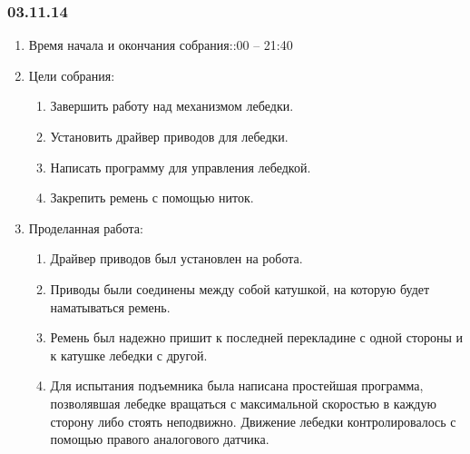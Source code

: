 	
\subsubsection{03.11.14}

\begin{enumerate}
	\item Время начала и окончания собрания::00 – 21:40
	\item Цели собрания:\newline
	\begin{enumerate}
	  \item	Завершить работу над механизмом лебедки.\newline
	  
	  \item	Установить драйвер приводов для лебедки.\newline
	  
	  \item	Написать программу для управления лебедкой.\newline
	  
	  \item	Закрепить ремень с помощью ниток.\newline
	  
    \end{enumerate}
    
	\item Проделанная работа:\newline
	\begin{enumerate}
	  \item	Драйвер приводов был установлен на робота.\newline
      
      \item	Приводы были соединены между собой катушкой, на которую будет наматываться ремень.\newline
      
      \item	Ремень был надежно пришит к последней перекладине с одной стороны и к катушке лебедки с другой.\newline
      
      \item	Для испытания подъемника была написана простейшая программа, позволявшая лебедке вращаться с максимальной скоростью в каждую сторону либо стоять неподвижно. Движение лебедки контролировалось с помощью правого аналогового датчика.\newline
      

\end{enumerate}
\end{enumerate}
